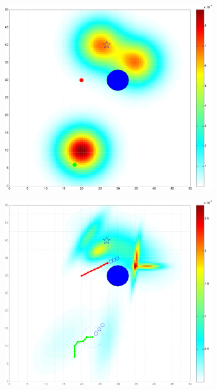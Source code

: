 \documentclass[twocolumn,10pt]{asme2e}
\begin{document}
\begin{figure}\label{scenario two}
	\centering
	\begin{subfigure}[b]{0.2\textwidth}
		\includegraphics[width=\textwidth]{figures/clt_2_sim3_init_newcm1}
		\caption{}\label{fig:clt_2_sim_init}
	\end{subfigure}
	\begin{subfigure}[b]{0.2\textwidth}
		\includegraphics[width=\textwidth]{figures/clt_2_sim3_leave_clt_newcm1}

\end{subfigure}
\end{figure}
\end{document}
